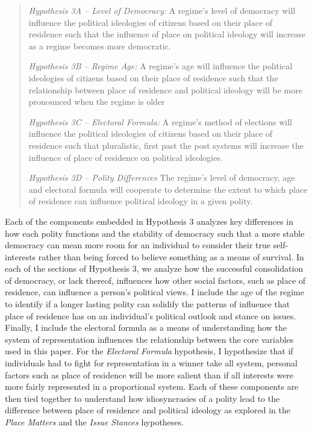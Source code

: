 \documentclass[12pt, titlepage]{article}
\newcommand\e{\emph}
\begin{document}
\begin{quote}
	\e{Hypothesis 3A -- Level of Democracy:} A regime's level of democracy will influence the political ideologies of citizens based on their place of residence such that the influence of place on political ideology will increase as a regime becomes more democratic. 
	
	\e{Hypothesis 3B -- Regime Age:} A regime's age will influence the political ideologies of citizens based on their place of residence such that the relationship between place of residence and political ideology will be more pronounced when the regime is older
	
	\e{Hypothesis 3C -- Electoral Formula:} A regime's method of elections will influence the political ideologies of citizens based on their place of residence such that pluralistic, first past the post systems will increase the influence of place of residence on political ideologies.
	
	\e{Hypothesis 3D -- Polity Differences} The regime's level of democracy, age and electoral formula will cooperate to determine the extent to which place of residence can influence political ideology in a given polity.
\end{quote}

Each of the components embedded in Hypothesis 3 analyzes key differences in how each polity functions and the stability of democracy such that a more stable democracy can mean more room for an individual to consider their true self-interests rather than being forced to believe something as a means of survival. In each of the sections of Hypothesis 3, we analyze how the successful consolidation of democracy, or lack thereof, influences how other social factors, such as place of residence, can influence a person's political views. I include the age of the regime to identify if a longer lasting polity can solidify the patterns of influence that place of residence has on an individual's political outlook and stance on issues. Finally, I include the electoral formula as a means of understanding how the system of representation influences the relationship between the core variables used in this paper. For the \e{Electoral Formula} hypothesis, I hypothesize that if individuals had to fight for representation in a winner take all system, personal factors such as place of residence will be more salient than if all interests were more fairly represented in a proportional system. Each of these components are then tied together to understand how idiosyncrasies of a polity lead to the difference between place of residence and political ideology as explored in the \e{Place Matters} and the \e{Issue Stances} hypotheses.
\end{document}
